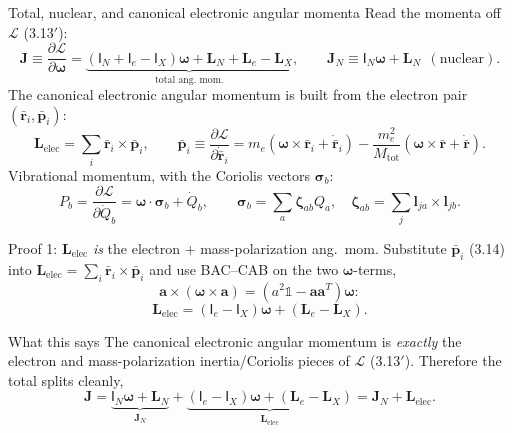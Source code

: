 \documentclass[aspectratio=169,10pt]{beamer}
\newcommand{\stagenum}{0}
\newcommand{\setstage}[1]{\renewcommand{\stagenum}{#1}}
\begin{document}
\begin{frame}{Total, nuclear, and canonical electronic angular momenta}
\setstage{2}
Read the momenta off $\mathcal L$ (3.13$'$):
\begin{equation*}
\mathbf J\equiv\frac{\partial \mathcal L}{\partial\boldsymbol\omega}
=\underbrace{(\mathsf I_N+\mathsf I_e-\mathsf I_X)\boldsymbol\omega+\mathbf L_N+\mathbf L_e-\mathbf L_X}_{\text{total ang.\ mom.}},
\qquad
\mathbf J_N\equiv\mathsf I_N\boldsymbol\omega+\mathbf L_N\ \ (\text{nuclear}). \tag{3.16, 3.15}
\end{equation*}
The \alert{canonical electronic angular momentum} is built from the electron pair $(\bar{\mathbf r}_i,\bar{\mathbf p}_i)$:
\begin{equation*}
\mathbf L_{\mathrm{elec}}=\sum_i\bar{\mathbf r}_i\!\times\!\bar{\mathbf p}_i,\qquad
\bar{\mathbf p}_i\equiv\frac{\partial \mathcal L}{\partial\dot{\bar{\mathbf r}}_i}
=m_e(\boldsymbol\omega\!\times\!\bar{\mathbf r}_i+\dot{\bar{\mathbf r}}_i)-\frac{m_e^2}{M_{\mathrm{tot}}}(\boldsymbol\omega\!\times\!\bar{\mathbf r}+\dot{\bar{\mathbf r}}). \tag{3.14}
\end{equation*}
Vibrational momentum, with the \alert{Coriolis vectors} $\boldsymbol\sigma_b$:
\begin{equation*}
P_b=\frac{\partial \mathcal L}{\partial\dot Q_b}=\boldsymbol\omega\!\cdot\!\boldsymbol\sigma_b+\dot Q_b,\qquad
\boldsymbol\sigma_b=\sum_a\boldsymbol\zeta_{ab}Q_a,\quad \boldsymbol\zeta_{ab}=\sum_j\mathbf l_{ja}\!\times\!\mathbf l_{jb}. \tag{3.17a,b}
\end{equation*}
\end{frame}

\begin{frame}{Proof 1: $\mathbf L_{\mathrm{elec}}$ \emph{is} the electron $+$ mass-polarization ang.\ mom.}
\setstage{2}
Substitute $\bar{\mathbf p}_i$ (3.14) into $\mathbf L_{\mathrm{elec}}=\sum_i\bar{\mathbf r}_i\!\times\!\bar{\mathbf p}_i$ and use BAC--CAB on the two $\boldsymbol\omega$-terms,
\begin{equation*}
\mathbf a\!\times\!(\boldsymbol\omega\!\times\!\mathbf a)=(a^2\mathbb 1-\mathbf a\mathbf a^{T})\boldsymbol\omega :
\end{equation*}
\begin{equation*}
\boxed{\;\mathbf L_{\mathrm{elec}}=(\mathsf I_e-\mathsf I_X)\boldsymbol\omega+(\mathbf L_e-\mathbf L_X).\;}\tag{3.18}
\end{equation*}
\begin{block}{What this says}
The canonical electronic angular momentum is \emph{exactly} the electron and mass-polarization inertia/Coriolis pieces of $\mathcal L$ (3.13$'$). Therefore the total splits cleanly,
\[
\mathbf J=\underbrace{\mathsf I_N\boldsymbol\omega+\mathbf L_N}_{\mathbf J_N}+\underbrace{(\mathsf I_e-\mathsf I_X)\boldsymbol\omega+(\mathbf L_e-\mathbf L_X)}_{\mathbf L_{\mathrm{elec}}}=\mathbf J_N+\mathbf L_{\mathrm{elec}}. \tag{3.16}
\]
\end{block}
\end{frame}
\end{document}
